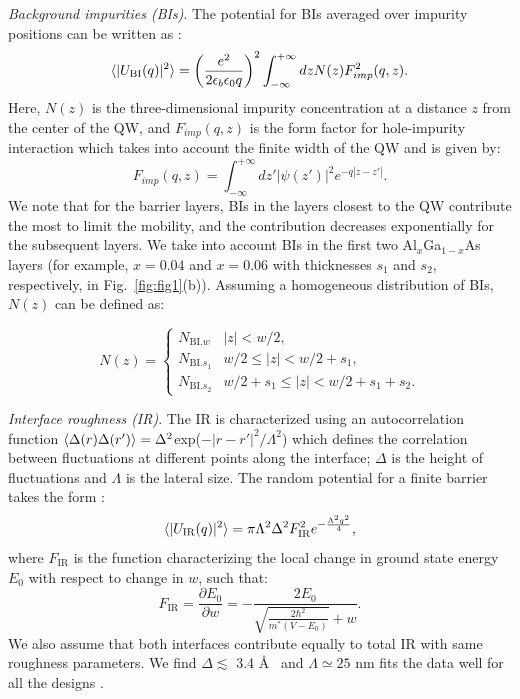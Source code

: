 \documentclass[reprint,amsmath,amssymb,aps,prl,nobibnotes,superscriptaddress]{revtex4-1}
\begin{document}
\textit{Background impurities (BIs)}. The potential for BIs averaged over impurity positions can be written as \cite{Gold1989, Huang2022}:
\begin{equation}
\braket{|U_{\textrm{BI}}(q)|^2}=\left(\frac{e^2}{2\epsilon_b\epsilon_0q}\right)^2\int_{-\infty}^{+\infty}dz N(z)F_{imp}^2(q,z).
\label{eq:BI}
\end{equation}
Here, $N(z)$ is the three-dimensional impurity concentration at a distance $z$ from the center of the QW, and  $F_{imp}(q,z)$ is the form factor for hole-impurity interaction which takes into account the finite width of the QW and is given by:
\begin{equation}
F_{imp}(q,z)=\int_{-\infty}^{+\infty}dz'|\psi(z')|^2e^{-q|z-z'|}.
\label{eq:ff2}
\end{equation} 
We note that for the barrier layers, BIs in the layers closest to the QW contribute the most to limit the mobility, and the contribution decreases exponentially for the subsequent layers. We take into account BIs in the first two Al$_x$Ga$_{1-x}$As layers (for example, $x=0.04$ and $x=0.06$ with thicknesses $s_1$ and $s_2$, respectively, in Fig.~\ref{fig:fig1}(b)). Assuming a homogeneous distribution of BIs, $N(z)$ can be defined as:

\begin{equation}
\
N(z) =
\begin{cases}
    N_{\textrm{BI.}w} &  |z| < w/2, \\
    N_{\textrm{BI.}s_1} &  w/2 \leq |z| < w/2+s_1, \\
    N_{\textrm{BI.}s_2}&  w/2+s_1 \leq |z| < w/2+s_1+s_2.
\end{cases}
\
\label{eq:NBI}
\end{equation}

\textit{Interface roughness (IR)}. The IR is characterized using an autocorrelation function $\braket{\Delta(r)\Delta(r')}=\Delta^2$exp($-|r-r'|^2/\Lambda^2$) which defines the correlation between fluctuations at different points along the interface;  $\Delta$ is the height of fluctuations and $\Lambda$ is the lateral size. The random potential for a finite barrier takes the form \cite{Li2005}:
\begin{equation}
\braket{|U_\textrm{IR}(q)|^2}=\pi\Lambda^2\Delta^2F_\textrm{IR}^2e^{-\frac{\Lambda^2q^2}{4}},
\label{eq:IR}
\end{equation}
where $F_\textrm{IR}$ is the function characterizing the local change in ground state energy $E_0$ with respect to change in $w$, such that:
\begin{equation}
F_\textrm{IR}=\frac{\partial E_0}{\partial w}= -\frac{2E_0}{\sqrt{\frac{2\hbar^2}{m^*(V-E_0)}}+w}.
\label{eq:FIR}
\end{equation}
We also assume that both interfaces contribute equally to total IR with same roughness parameters. We find $\Delta \lesssim$ 3.4 \AA~ and $\Lambda \simeq 25$ nm fits the data well for all the designs .
\end{document}
